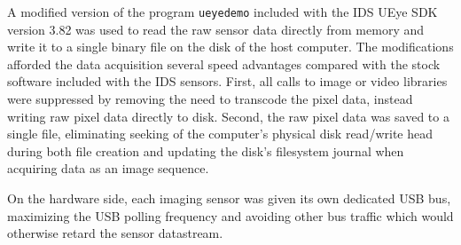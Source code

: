 A modified version of the program \texttt{ueyedemo} included with the IDS
UEye SDK version 3.82 was used to read the raw sensor data directly from
memory and write it to a single binary file on the disk of the host
computer.  The modifications afforded the data acquisition several speed
advantages compared with the stock software included with the IDS sensors.
First, all calls to image or video libraries were suppressed by removing
the need to transcode the pixel data, instead writing raw pixel data
directly to disk.  Second, the raw pixel data was saved to a single file,
eliminating seeking of the computer's physical disk read/write head during
both file creation and updating the disk's filesystem journal when
acquiring data as an image sequence.

On the hardware side, each imaging sensor was given its own dedicated USB
bus, maximizing the USB polling frequency and avoiding other bus traffic
which would otherwise retard the sensor datastream.  

